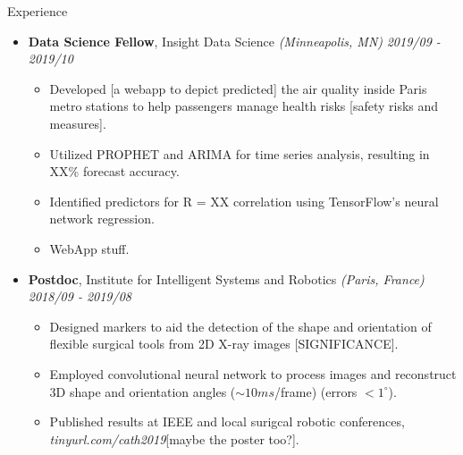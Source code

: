 \documentclass{resume} %
\begin{document}
\begin{rSection}{Experience}
	
	\begin{itemize}
	\item {\bf Data Science Fellow}{, Insight Data Science \textit{(Minneapolis, MN)}} \hfill {\em 2019/09 - 2019/10}\\
	\vspace{-5mm}
	\begin{itemize}
		\setlength\itemsep{-1.75em}
		\item Developed [a webapp to depict predicted] the air quality inside Paris metro stations to help passengers manage health risks [safety risks and measures].\\
		\item Utilized PROPHET and ARIMA for time series analysis, resulting in XX\% forecast accuracy.\\
		\item Identified predictors for R = XX correlation using TensorFlow's neural network regression.\\
		\item WebApp stuff.
	\end{itemize}	
	
	\item {\bf Postdoc}{, Institute for Intelligent Systems and Robotics \textit{(Paris, France)}} \hfill {\em 2018/09 - 2019/08}\\
	\vspace{-5mm}
	\begin{itemize}
		\setlength\itemsep{-1.75em}
		\item  Designed markers to aid the detection of the shape and orientation of flexible surgical tools from 2D X-ray images [SIGNIFICANCE].\\ 
		\item  Employed convolutional neural network to process images and reconstruct 3D shape and orientation angles ($\sim 10 ms$/frame) (errors $< 1 ^\circ$).\\
		\item  Published results at IEEE and local surigcal robotic conferences, \textit{tinyurl.com/cath2019}[maybe the poster too?].
	\end{itemize}
	

\end{itemize}
\end{rSection}
\end{document}
